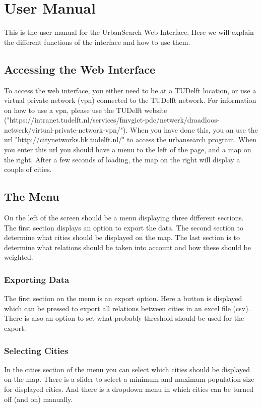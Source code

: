 \chapter{User Manual}
This is the user manual for the UrbanSearch Web Interface. Here we will explain the different functions of the interface and how to use them. 

\section{Accessing the Web Interface}
To access the web interface, you either need to be at a TUDelft location, or use a virtual private network (vpn) connected to the TUDelft network. For information on how to use a vpn, please use the TUDelft website ("https://intranet.tudelft.nl/services/fmvgict-pdc/netwerk/draadloos-netwerk/virtual-private-network-vpn/"). When you have done this, you an use the url "http://citynetworks.bk.tudelft.nl/" to access the urbansearch program. When you enter this url you should have a menu to the left of the page, and a map on the right. After a few seconds of loading, the map on the right will display a couple of cities. 


\section{The Menu}
On the left of the screen should be a menu displaying three different sections. The first section displays an option to export the data. The second section to determine what cities should be displayed on the map. The last section is to determine what relations should be taken into account and how these should be weighted.

\subsection{Exporting Data}
The first section on the menu is an export option. Here a button is displayed which can be pressed to export all relations between cities in an excel file (csv). There is also an option to set what probably threshold should be used for the export. 


\subsection{Selecting Cities}
In the cities section of the menu you can select which cities should be displayed on the map. There is a slider to select a minimum and maximum population size for displayed cities. And there is a dropdown menu in which cities can be turned off (and on) manually. 


